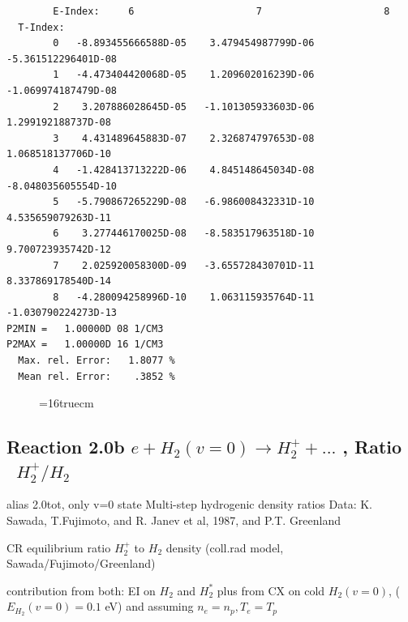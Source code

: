 \documentclass[12pt,dvipdfmx]{article}
\begin{document}
\begin{small}
\begin{verbatim}
        E-Index:     6                     7                     8
  T-Index:
        0   -8.893455666588D-05    3.479454987799D-06   -5.361512296401D-08
        1   -4.473404420068D-05    1.209602016239D-06   -1.069974187479D-08
        2    3.207886028645D-05   -1.101305933603D-06    1.299192188737D-08
        3    4.431489645883D-07    2.326874797653D-08    1.068518137706D-10
        4   -1.428413713222D-06    4.845148645034D-08   -8.048035605554D-10
        5   -5.790867265229D-08   -6.986008432331D-10    4.535659079263D-11
        6    3.277446170025D-08   -8.583517963518D-10    9.700723935742D-12
        7    2.025920058300D-09   -3.655728430701D-11    8.337869178540D-14
        8   -4.280094258996D-10    1.063115935764D-11   -1.030790224273D-13
P2MIN =   1.00000D 08 1/CM3
P2MAX =   1.00000D 16 1/CM3
  Max. rel. Error:   1.8077 %
  Mean rel. Error:    .3852 %

\end{verbatim}\end{small}
\begin{figure} \label{h12_2.0a}
\epsfxsize=16truecm
\end{figure}

\newpage
\subsection{
Reaction 2.0b $e + H_2(v=0) \rightarrow H_2^+ + ... $ , Ratio  \ $H_2^+/H_2$
}
alias 2.0tot,  only v=0 state
 Multi-step hydrogenic density ratios
 Data: K. Sawada, T.Fujimoto, \cite{kn:Sawada} and R. Janev et al, 1987, and P.T. Greenland


  CR equilibrium ratio $H_2^+$ to $H_2$ density
  (coll.rad model, Sawada/Fujimoto/Greenland)

  contribution from both: EI on $H_2$ and $H_2^*$  plus from CX on cold $H_2(v=0)$,
($E_{H_2}(v=0)=0.1$ eV) and assuming $n_e=n_p, T_e=T_p$
\end{document}

